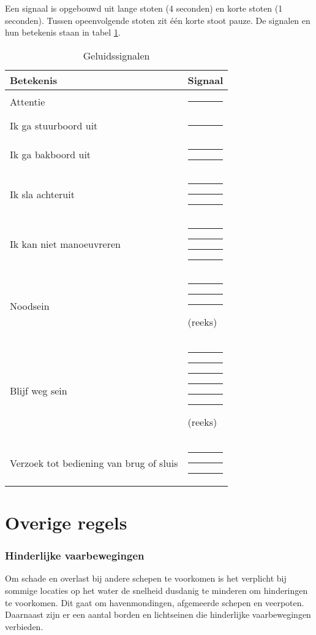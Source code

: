 Een signaal is opgebouwd uit lange stoten (4 seconden) en korte stoten (1 seconden). Tussen opeenvolgende stoten zit één korte stoot pauze. De signalen en hun betekenis staan in tabel \ref{tab:geluid}.

\newcommand{\sshort}{\rule{2mm}{2mm}} %
\newcommand{\slong}{\rule{6mm}{2mm}}  %
\newcommand{\sspace}{\hspace{2mm}}  %


\begin{table}[h]
	\centering
	\caption{Geluidssignalen}
	\label{tab:geluid}
	\begin{tabular}{l|l}
		\textbf{Betekenis} & \textbf{Signaal} \\ \hline
		Attentie & \slong  \\
		Ik ga stuurboord uit & \sshort \\
		Ik ga bakboord uit & \sshort \sspace \sshort \\
		Ik sla achteruit & \sshort \sspace \sshort \sspace \sshort \\
		Ik kan niet manoeuvreren & \sshort \sspace \sshort \sspace \sshort \sspace \sshort \\
		Noodsein & \slong \sspace  \slong \sspace  \slong \sspace (reeks)  \\
		Blijf weg sein\footnotemark & \sshort \sspace \slong \sspace \sshort \sspace \slong \sspace  \sshort \sspace \slong \sspace (reeks)  \\
		Verzoek tot bediening van brug of sluis & \slong \sspace  \sshort \sspace  \slong
	\end{tabular}
\end{table}


\section{Overige regels}
\subsubsection*{Hinderlijke vaarbewegingen}
Om schade en overlast bij andere schepen te voorkomen is het verplicht bij sommige locaties op het water de snelheid dusdanig te minderen om hinderingen te voorkomen. Dit gaat om havenmondingen, afgemeerde schepen en veerpoten. Daarnaast zijn er een aantal borden en lichtseinen die hinderlijke vaarbewegingen verbieden.




